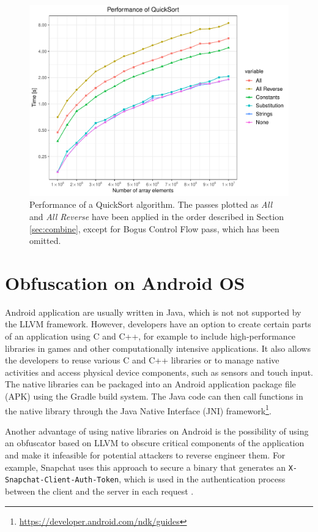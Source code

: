 \documentclass[
  digital, %
  notable,   %
  twoside, %
  nolof,     %
  nolot,     %
]{fithesis3}
\theoremstyle{definition}
\begin{document}
\begin{figure}[!h]
    \centering
    \includegraphics[height=0.38\textheight]{qs_bench.pdf}
    \caption{Performance of a QuickSort algorithm. The passes plotted as \textit{All} and \textit{All Reverse} have been applied in the order described in Section \ref{sec:combine}, except for Bogus Control Flow pass, which has been omitted.}
    \label{fig:qs_bench}
\end{figure}

\chapter{Obfuscation on Android OS}
Android application are usually written in Java, which is not not supported by the LLVM framework. However, developers have an option to create certain parts of an application using C and C++, for example to include high-performance libraries in games and other computationally intensive applications. It also allows the developers to reuse various C and C++ libraries or to manage native activities and access physical device components, such as sensors and touch input. The native libraries can be packaged into an Android application package file (APK) using the Gradle build system. The Java code can then call functions in the native library through the Java Native Interface (JNI) framework\footnote{\url{https://developer.android.com/ndk/guides}}.

Another advantage of using native libraries on Android is the possibility of using an obfuscator based on LLVM to obscure critical components of the application and make it infeasible for potential attackers to reverse engineer them. For example, Snapchat uses this approach to secure a binary that generates an \texttt{X-Snapchat-Client-Auth-Token}, which is used in the authentication process between the client and the server in each request \cite{snap_rev}. 
\end{document}
